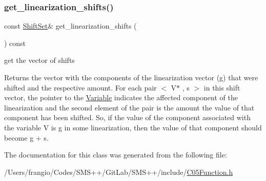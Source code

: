 \subsubsection{\texorpdfstring{get\+\_\+linearization\+\_\+shifts()}{get\_linearization\_shifts()}}
{\footnotesize\ttfamily const \mbox{\hyperlink{class_s_m_spp__di__unipi__it_1_1_c05_function_mod_shift_a2ff0fedb58393e9ed307342d2e5d781a}{Shift\+Set}}\& get\+\_\+linearization\+\_\+shifts (\begin{DoxyParamCaption}\item[{void}]{ }\end{DoxyParamCaption}) const\hspace{0.3cm}{\ttfamily [inline]}}



get the vector of shifts 

Returns the vector with the components of the linearization vector (g) that were shifted and the respective amount. For each pair $<$ V$\ast$ , s $>$ in this shift vector, the pointer to the \mbox{\hyperlink{class_s_m_spp__di__unipi__it_1_1_variable}{Variable}} indicates the affected component of the linearization and the second element of the pair is the amount the value of that component has been shifted. So, if the value of the component associated with the variable V is g in some linearization, then the value of that component should become g + s. 

The documentation for this class was generated from the following file\+:\begin{DoxyCompactItemize}
\item 
/\+Users/frangio/\+Codes/\+S\+M\+S++/\+Git\+Lab/\+S\+M\+S++/include/\mbox{\hyperlink{_c05_function_8h}{C05\+Function.\+h}}\end{DoxyCompactItemize}

